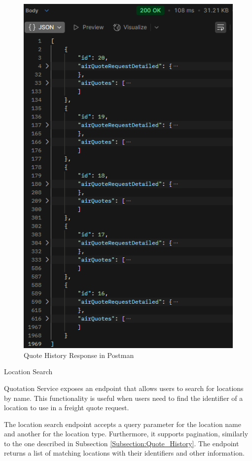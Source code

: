 \documentclass[12pt,reqno, oneside]{amsbook}
\makeatletter
\def\subsection{\@startsection{subsection}{2}%
      \z@{.5\linespacing\@plus.7\linespacing}{.25\linespacing}%
      {\normalfont\bfseries\flushleft}}
\theoremstyle{definition}
\theoremstyle{definition}
\numberwithin{section}{chapter}
\numberwithin{table}{chapter}
\numberwithin{figure}{chapter}
\makeatother
\begin{document}
\begin{figure}[H]
  \centering
  \includegraphics[width=0.7\linewidth]{images/QuoteHistoryResponsePostman.png}
  \caption{\label{Figure:QuoteHistoryResponsePostman}Quote History Response in Postman}
\end{figure}

\pagebreak

\subsection{Location Search}

Quotation Service exposes an endpoint that allows users to search for locations by name. This functionality is useful when users need to find the identifier of a location to use in a freight quote request.

The location search endpoint accepts a query parameter for the location name and another for the location type. Furthermore, it supports pagination, similarly to the one described in Subsection \ref{Subsection:Quote_History}. The endpoint returns a list of matching locations with their identifiers and other information.
\end{document}
